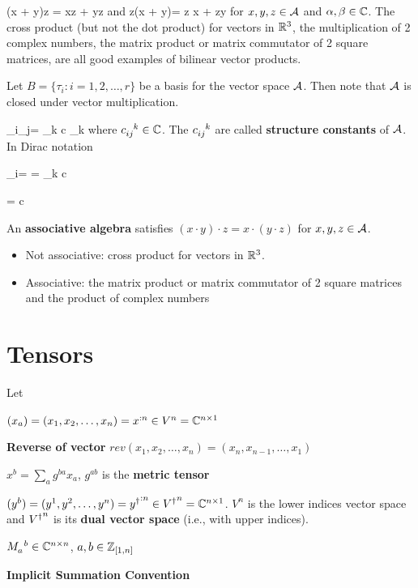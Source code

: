 \beq
(\alp x + \beta y)\cdot z =
\alp x\cdot z +
\beta y\cdot z
\eeq
and 
\beq
z\cdot(\alp x + \beta y)=
\alp z \cdot x +
\beta z\cdot y
\eeq
for $x,y, z\in {\cal A}$ and 
$\alpha, \beta\in{ \mathbb{C}}$.
The cross product (but not the dot product)
for vectors in ${ \mathbb{R}}^3$,
the multiplication of 2 complex numbers, the matrix product or  matrix commutator of 2
square matrices, are all good examples of
bilinear vector products.

Let $B = \{\tau_i: i=1, 2, \ldots, r\}$
be a basis for the vector space ${\cal A}$. 
Then note that
${\cal A}$ is closed under vector multiplication. 

\beq
\tau_i\cdot \tau_j=
\sum_k c \tau_k
\eeq
where $c\indices{_{ij}^k}\in\CC$.
The $c\indices{_{ij}^k}$ are called 
{\bf structure constants} of ${\cal A}$.
In Dirac notation

\beq
\tau_i=
=
\sum_k c
\eeq

\beq
{}= c
\eeq

An {\bf associative algebra} satisfies 
$(x\cdot y)\cdot z = x\cdot(y\cdot z)$ for
$x,y,z\in {\cal A}$.
\begin{itemize}
\item Not associative: cross product for vectors in  ${ \mathbb{R}}^3$.
\item Associative:
the matrix product or matrix commutator of 2  square matrices and the product of complex numbers
\end{itemize}

\section{Tensors}
\label{sec-tensors}
Let 

$(x_a)=(x_1, x_2, \ldots, x_n) = x^{:n}\in V^n={ \mathbb{C}}^{n\times 1}$

{\bf Reverse of vector} $rev(x_1, x_2, \ldots, x_n)=
(x_n, x_{n-1},
\ldots, x_1)$

$x^b = \sum_a g^{ba} x_a$, $g^{ab}$ is the
{\bf metric tensor}

$(y^b)=(y^1, y^2, \ldots, y^n)= {y^\dagger}^{:n}\in {V^\dagger}^n={ \mathbb{C}}^{n\times 1}$. $V^n$ is the lower indices vector space and
${V^\dagger}^n$ is its {\bf dual vector space} (i.e., with upper indices).



$M\indices{_a^b}\in \CC^{n\times n}$, $a, b\in{\mathbb{Z}}_{[1,n]}$

{\bf Implicit Summation Convention}

